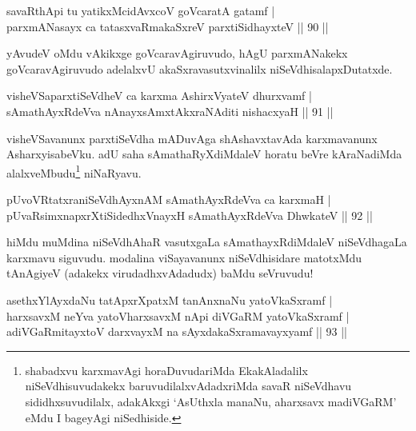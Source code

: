 \begin{shl}
savaRthA\s pi tu yatikxMcidAvxcoV goVcaratA gatamf |\\
parxmANasayx ca tatasxvaRmakaSxreV parxtiSidhayxteV \hfill || 90 ||
\end{shl}

\begin{artha}
yAvudeV oMdu vAkikxge goVcaravAgiruvudo, hAgU parxmANakekx goVcaravAgiruvudo adelalxvU akaSxravasutxvinalilx niSeVdhisalapxDutatxde.
\end{artha}


\begin{shl}
visheVSaparxtiSeVdheV ca karxma AshirxVyateV dhurxvamf |\\
sAmathAyxRdeVva nAnayxsAmxtAkxraNAditi nishacxyaH \hfill || 91 ||
\end{shl}

\begin{artha}
visheVSavanunx parxtiSeVdha mADuvAga shAshavxtavAda karxmavanunx AsharxyisabeVku. adU saha sAmathaRyXdiMdaleV horatu beVre kAraNadiMda alalxveMbudu\footnote{shabadxvu karxmavAgi horaDuvudariMda EkakAladalilx niSeVdhisuvudakekx baruvudilalxvAdadxriMda savaR niSeVdhavu sididhxsuvudilalx, adakAkxgi `AsUthxla manaNu, aharxsavx madiVGaRM' eMdu I bageyAgi niSedhiside.} niNaRyavu.
\end{artha}


\begin{shl}
pUvoVRtatxraniSeVdhAyxnAM sAmathAyxRdeVva ca karxmaH |\\
pUvaRsimxnapxrXtiSidedhxV\s nayxH sAmathAyxRdeVva DhwkateV \hfill || 92 ||
\end{shl}

\begin{artha}
hiMdu muMdina niSeVdhAhaR vasutxgaLa sAmathayxRdiMdaleV niSeVdhagaLa karxmavu siguvudu. modalina viSayavanunx niSeVdhisidare matotxMdu tAnAgiyeV (adakekx virudadhxvAdadudx) baMdu seVruvudu!
\end{artha}%


\begin{shl}
asethxYlAyxdaNu tatApxrXpatxM tanAnxnaNu yatoV\s kaSxramf |\\
harxsavxM neYva yatoV\s harxsavxM nApi diVGaRM yatoV\s kaSxramf |\\
adiVGaRmitayxtoV darxvayxM na sAyxdakaSxramavayxyamf \hfill || 93 ||
\end{shl}

